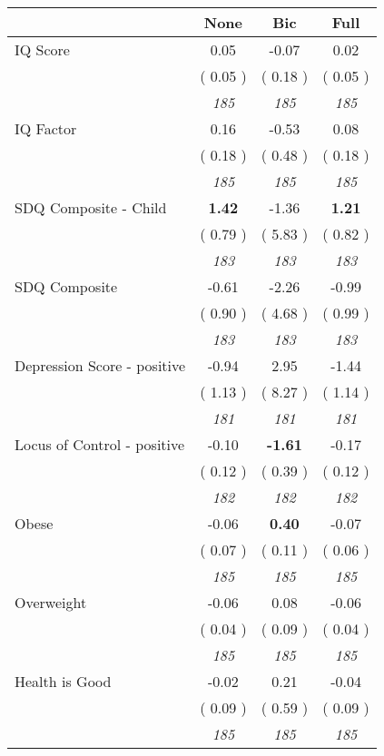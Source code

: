 \begin{tabular}{l c c c}
\toprule
 & None & Bic & Full \\
\midrule
IQ Score &      0.05 &     -0.07 &      0.02 \\
& (     0.05 ) & (     0.18 ) & (     0.05 ) \\
& \textit{ 185 } & \textit{ 185 } & \textit{ 185 } \\
IQ Factor &      0.16 &     -0.53 &      0.08 \\
& (     0.18 ) & (     0.48 ) & (     0.18 ) \\
& \textit{ 185 } & \textit{ 185 } & \textit{ 185 } \\
SDQ Composite - Child & \textbf{      1.42 } &     -1.36 & \textbf{      1.21 } \\
& (     0.79 ) & (     5.83 ) & (     0.82 ) \\
& \textit{ 183 } & \textit{ 183 } & \textit{ 183 } \\
SDQ Composite &     -0.61 &     -2.26 &     -0.99 \\
& (     0.90 ) & (     4.68 ) & (     0.99 ) \\
& \textit{ 183 } & \textit{ 183 } & \textit{ 183 } \\
Depression Score - positive &     -0.94 &      2.95 &     -1.44 \\
& (     1.13 ) & (     8.27 ) & (     1.14 ) \\
& \textit{ 181 } & \textit{ 181 } & \textit{ 181 } \\
Locus of Control - positive &     -0.10 & \textbf{     -1.61 } &     -0.17 \\
& (     0.12 ) & (     0.39 ) & (     0.12 ) \\
& \textit{ 182 } & \textit{ 182 } & \textit{ 182 } \\
Obese &     -0.06 & \textbf{      0.40 } &     -0.07 \\
& (     0.07 ) & (     0.11 ) & (     0.06 ) \\
& \textit{ 185 } & \textit{ 185 } & \textit{ 185 } \\
Overweight &     -0.06 &      0.08 &     -0.06 \\
& (     0.04 ) & (     0.09 ) & (     0.04 ) \\
& \textit{ 185 } & \textit{ 185 } & \textit{ 185 } \\
Health is Good &     -0.02 &      0.21 &     -0.04 \\
& (     0.09 ) & (     0.59 ) & (     0.09 ) \\
& \textit{ 185 } & \textit{ 185 } & \textit{ 185 } \\

\end{tabular}
